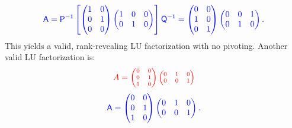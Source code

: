 \documentclass[10pt,twoside]{siamart1116}
\numberwithin{theorem}{section}
\providecommand{\DIFadd}[1]{{\protect\color{blue} \sf #1}} %
\providecommand{\DIFdel}[1]{{\protect\color{red} \scriptsize #1}} %
\providecommand{\DIFaddbegin}{} %
\providecommand{\DIFaddend}{} %
\providecommand{\DIFdelbegin}{} %
\providecommand{\DIFdelend}{} %
\begin{document}
\DIFdelend \DIFaddbegin \[
  \DIFadd{A = P^{-1} \left[
    \begin{pmatrix} 1 & 0 \\ 0 & 1 \\ 0 & 0
    \end{pmatrix}
    \begin{pmatrix} 1 & 0 & 0 \\ 0 & 1 & 0
  \end{pmatrix} \right] Q^{-1} =
  \begin{pmatrix} 0 & 0 \\ 1 & 0 \\ 0 & 1
  \end{pmatrix}
  \begin{pmatrix} 0 & 0 & 1 \\ 0 & 1 & 0
  \end{pmatrix}.
}\]\DIFaddend 
This yields a valid, rank-revealing LU factorization with no pivoting. Another valid LU factorization is:
\DIFdelbegin \[
	\DIFdel{A = \begin{pmatrix} 0 & 0 \\ 0 & 1 \\ 1 & 0 \end{pmatrix}
	\begin{pmatrix} 0 & 1 & 0 \\ 0 & 0 & 1 \end{pmatrix}
}\]%
\DIFdelend \DIFaddbegin \[
  \DIFadd{A =
  \begin{pmatrix} 0 & 0 \\ 0 & 1 \\ 1 & 0
  \end{pmatrix}
  \begin{pmatrix} 0 & 1 & 0 \\ 0 & 0 & 1
  \end{pmatrix}.
}\]\DIFaddend 
\end{document}
